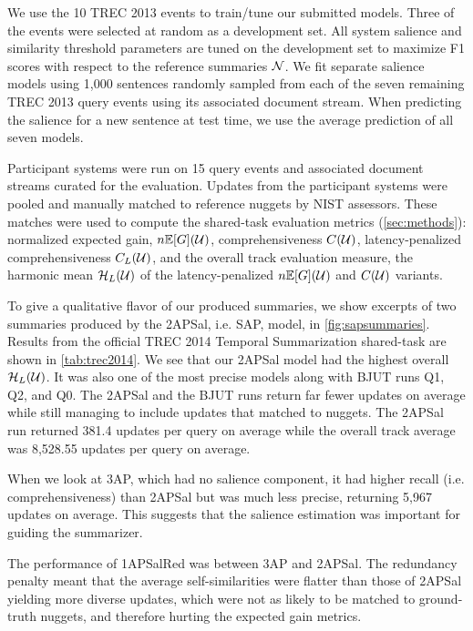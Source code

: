We use the 10 TREC 2013 events to train/tune our submitted models.  Three of
the events were selected at random as a development set. All system salience
and similarity threshold parameters are tuned on the development set to
maximize  F1 scores with respect to the reference summaries
$\mathcal{N}$.  We fit separate salience models using 1,000 sentences randomly
sampled from each of the seven remaining TREC 2013 query events using its
associated document stream.  When predicting the salience for a new sentence at
test time, we use the average prediction of all seven models. 


Participant systems were run on 15 query events and associated document streams
curated for the evaluation.  Updates from the participant systems were pooled
and manually matched to reference nuggets by NIST assessors. These matches were
used to compute the  shared-task evaluation metrics (\autoref{sec:methods}):
normalized expected gain, $n\mathbb{E}[G](\mathcal{U})$, comprehensiveness
$C(\mathcal{U})$, latency-penalized comprehensiveness
$C_L(\mathcal{U})$, and the overall track evaluation measure, the
harmonic mean $\mathcal{H}_L(\mathcal{U})$ of the latency-penalized
$n\mathbb{E}[G](\mathcal{U})$ and $C(\mathcal{U})$ variants.



To give a qualitative flavor of our produced summaries, we show excerpts of two
summaries produced by the 2APSal, i.e. SAP, model, in
\autoref{fig:sapsummaries}.  Results from the official TREC 2014 Temporal
Summarization shared-task are shown in \autoref{tab:trec2014}. We see that our
2APSal model had the highest overall $\mathcal{H}_L(\mathcal{U})$. It was
also one of the most precise models along with BJUT runs Q1, Q2, and Q0. The
2APSal and the BJUT runs return far fewer updates on average while still
managing to include updates that matched to nuggets. The 2APSal run returned
381.4 updates per query on average while the overall track average was 8,528.55
updates per query on average. 

When we look at 3AP, which had no salience component, it had higher recall
(i.e. comprehensiveness) than 2APSal but was much less precise, returning 5,967
updates on average. This suggests that the salience estimation was important
for guiding the summarizer. 

The performance of 1APSalRed was between 3AP and 2APSal. The redundancy penalty
meant that the average self-similarities were flatter than those of 2APSal
yielding more diverse updates, which were not as likely to be matched to
ground-truth nuggets, and therefore hurting the expected gain metrics.

